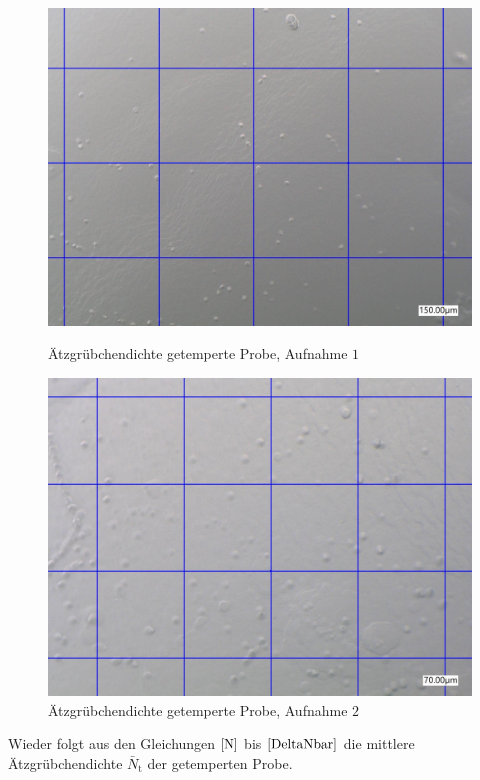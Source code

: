 \documentclass[12pt,a4paper]{scrartcl}
\numberwithin{equation}{section} %
\begin{document}
\begin{figure}[ht]
	\begin{minipage}[t]{.5\linewidth}
		\includegraphics[width=\textwidth]{../media/B2.8/Dichte1_tempered.pdf}
		\caption{Ätzgrübchendichte getemperte Probe, Aufnahme $1$}
		\label{abb:dichte_t_1}
	\end{minipage}
	\begin{minipage}[t]{.5\linewidth}
		\includegraphics[width=\textwidth]{../media/B2.8/Dichte2_tempered.pdf}
		\caption{Ätzgrübchendichte getemperte Probe, Aufnahme $2$}
		\label{abb:dichte_t_2}
	\end{minipage}
\end{figure}

Wieder folgt aus den Gleichungen $\eqref{N}$ bis $\eqref{DeltaNbar}$ die mittlere Ätzgrübchendichte $\bar N_\mathrm{t}$ der getemperten Probe.
\end{document}

